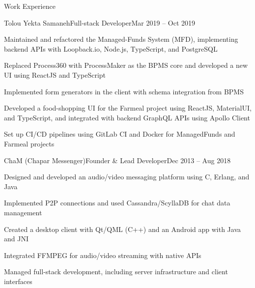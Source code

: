 \documentclass[]{main}
\begin{document}
\begin{section}{Work Experience}
 \begin{subsection}{Tolou Yekta Samaneh}{Full-stack Developer}{Mar 2019 -- Oct 2019}{}
     \item Maintained and refactored the Managed-Funds System (MFD), implementing backend APIs with Loopback.io, Node.js, TypeScript, and PostgreSQL
     \item Replaced Process360 with ProcessMaker as the BPMS core and developed a new UI using ReactJS and TypeScript
     \item Implemented form generators in the client with schema integration from BPMS
     \item Developed a food-shopping UI for the Farmeal project using ReactJS, MaterialUI, and TypeScript, and integrated with backend GraphQL APIs using Apollo Client
     \item Set up CI/CD pipelines using GitLab CI and Docker for ManagedFunds and Farmeal projects
 \end{subsection}

 \begin{subsection}{ChaM (Chapar Messenger)}{Founder \& Lead Developer}{Dec 2013 -- Aug 2018}{}
     \item Designed and developed an audio/video messaging platform using C, Erlang, and Java
     \item Implemented P2P connections and used Cassandra/ScyllaDB for chat data management
     \item Created a desktop client with Qt/QML (C++) and an Android app with Java and JNI
     \item Integrated FFMPEG for audio/video streaming with native APIs
     \item Managed full-stack development, including server infrastructure and client interfaces
 \end{subsection}
\end{section}

\end{document}
